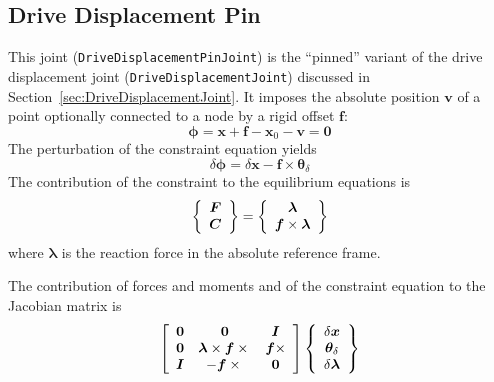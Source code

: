 \documentclass[10pt,fleqn,subeqn]{report}
\newcommand{\T}[1]{\bm{#1}}
\begin{document}
\subsection{Drive Displacement Pin}
\label{sec:DriveDisplacementPinJoint}
This joint (\texttt{DriveDisplacementPinJoint}) is the ``pinned'' variant 
of the drive displacement joint (\texttt{DriveDisplacementJoint}) discussed
in Section~\ref{sec:DriveDisplacementJoint}.
It imposes the absolute position $\T{v}$ of a point
optionally connected to a node by a rigid offset $\T{f}$:
\begin{equation}
	\T{\phi} = \T{x} + \T{f} - \T{x}_0 - \T{v} = \T{0}
\end{equation}
The perturbation of the constraint equation yields
\begin{equation}
	\delta\T{\phi} = 
	\delta\T{x} - \T{f}\times \T{\theta}_{\delta}
\end{equation}
The contribution of the constraint to the equilibrium equations is
\begin{equation}
	\cubr{\cvvect{
		\T{F} \\
		\T{C}
	}} = \cubr{\cvvect{
		\T{\lambda} \\
		\T{f}\times \T{\lambda}
	}}
\end{equation}
where $\T{\lambda}$ is the reaction force in the absolute reference frame.

The contribution of forces and moments and of the constraint equation 
to the Jacobian matrix is
\begin{equation}
	\sqbr{\matr{ccc}{
		\T{0} &
			\T{0} &
			\T{I} \\
		\T{0} &
			\T{\lambda}\times\T{f}\times{} &
			\T{f}\times \\
		\T{I} &
			- \T{f}\times{} &
			\T{0}
	}}\cubr{\cvvect{
		\delta\T{x} \\
		\T{\theta}_{\delta} \\
		\delta\T{\lambda}
	}}
\end{equation}
\end{document}
